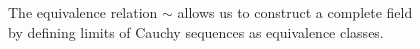 \documentclass[preview]{standalone}
\begin{document}
\begin{center}
The equivalence relation $\sim$ allows us to construct a complete field\\by defining limits of Cauchy sequences as equivalence classes.
\end{center}
\end{document}
